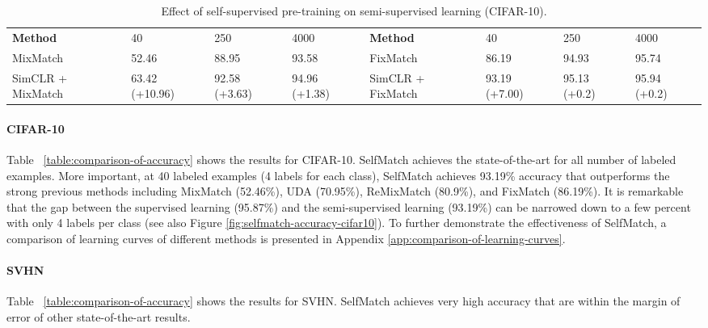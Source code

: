 \documentclass{article}
\begin{document}
\setlength{\tabcolsep}{7pt}
\begin{table}[t]
  \caption{Effect of self-supervised pre-training on semi-supervised learning (CIFAR-10).}
  \label{table:ablation-study}
  
\centering
  \begin{tabular}{m{1.5cm} m{0.8cm}m{0.8cm}m{0.8cm} m{1.5cm} m{0.8cm}m{0.8cm}m{0.8cm}}
    \toprule
    \textbf{Method}  & 40 & 250 & 4000 & \textbf{Method} & 40 & 250 & 4000 \\
    
    \cmidrule(lr){1-1} \cmidrule(lr){2-4} \cmidrule(lr){5-5} \cmidrule(lr){6-8}
    MixMatch & 52.46 & 88.95 & 93.58 & FixMatch & 86.19 & 94.93 & 95.74\\
    
    \cmidrule(lr){1-1} \cmidrule(lr){2-4} \cmidrule(lr){5-5} \cmidrule(lr){6-8}
    SimCLR + MixMatch & 63.42 (+10.96) & 92.58 (+3.63) & 94.96 (+1.38) & SimCLR + FixMatch & 93.19 (+7.00) & 95.13 (+0.2) & 95.94 (+0.2) \\
    
    \bottomrule
  \end{tabular}
\end{table}

\paragraph{CIFAR-10}
Table ~\ref{table:comparison-of-accuracy} shows the results for CIFAR-10. SelfMatch achieves the state-of-the-art for all number of labeled examples. More important, at 40 labeled examples (4 labels for each class), SelfMatch achieves 93.19\% accuracy that outperforms the strong previous methods including MixMatch \cite{berthelot2019mixmatch} (52.46\%), UDA \cite{xie2020unsupervised} (70.95\%), ReMixMatch \cite{berthelot2020remixmatch} (80.9\%), and FixMatch \cite{sohn2020fixmatch} (86.19\%). It is remarkable that the gap  between the supervised learning (95.87\%) and the semi-supervised learning (93.19\%) can be narrowed down to a few percent with only 4 labels per class (see also Figure \ref{fig:selfmatch-accuracy-cifar10}). To further demonstrate the effectiveness of SelfMatch, a comparison of learning curves of different methods is presented in Appendix \ref{app:comparison-of-learning-curves}.

\paragraph{SVHN}
Table ~\ref{table:comparison-of-accuracy} shows the results for SVHN. SelfMatch achieves very high accuracy that are within the margin of error of other state-of-the-art results.
\end{document}
